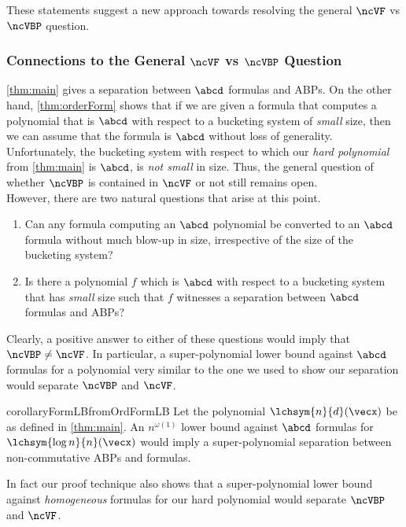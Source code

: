 \noindent These statements suggest a new approach towards resolving the general $\ncVF$ vs $\ncVBP$ question.

\subsubsection*{Connections to the General $\ncVF$ vs $\ncVBP$ Question}

\autoref{thm:main} gives a separation between $\abcd$ formulas and ABPs.
On the other hand, \autoref{thm:orderForm} shows that if we are given a formula that computes a polynomial that is $\abcd$ with respect to a bucketing system of \emph{small} size, then we can assume that the formula is $\abcd$ without loss of generality.
Unfortunately, the bucketing system with respect to which our \emph{hard polynomial} from \autoref{thm:main} is $\abcd$, is \emph{not small} in size.
Thus, the general question of whether $\ncVBP$ is contained in $\ncVF$ or not still remains open.\\ 

\noindent However, there are two natural questions that arise at this point.
\begin{enumerate}
	\item Can any formula computing an $\abcd$ polynomial be converted to an $\abcd$ formula without much blow-up in size, irrespective of the size of the bucketing system? 
	\item Is there a polynomial $f$ which is $\abcd$ with respect to a bucketing system that has \emph{small} size such that $f$ witnesses a separation between $\abcd$ formulas and ABPs?
\end{enumerate}

\noindent Clearly, a positive answer to either of these questions would imply that $\ncVBP \neq \ncVF$.
In particular, a super-polynomial lower bound against $\abcd$ formulas for a polynomial very similar to the one we used to show our separation would separate $\ncVBP$ and $\ncVF$.

\begin{restatable}{corollary}{FormLBfromOrdFormLB}\label{cor:FormLBfromOrdFormLB}
	Let the polynomial $\lchsym{n}{d}(\vecx)$ be as defined in \autoref{thm:main}.
	An $n^{\omega(1)}$ lower bound against $\abcd$ formulas for $\lchsym{\log n}{n}(\vecx)$ would imply a super-polynomial separation between non-commutative ABPs and formulas.
\end{restatable}

In fact our proof technique also shows that a super-polynomial lower bound against \emph{homogeneous} formulas for our hard polynomial would separate $\ncVBP$ and $\ncVF$.

